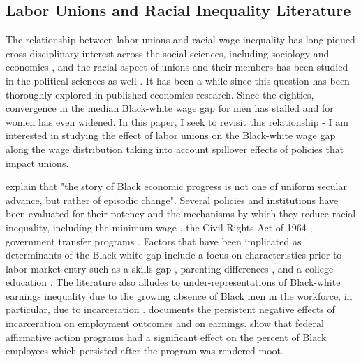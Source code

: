 \documentclass[11pt]{article}
\begin{document}
\subsection{Labor Unions and Racial Inequality Literature}
The relationship between labor unions and racial wage inequality has long piqued cross disciplinary interest across the social sciences, including sociology \citep[see, for example,][]{rosenfeldkleykamp2012, mccall2001} and economics \citep[see, for example,][]{ashenfelter1972, boundfreeman1992}, and the racial aspect of unions and their members has been studied in the political sciences as well \citep[see, for example,][]{frymergrumbach2020}. It has been a while since this question has been thoroughly explored in published economics research. Since the eighties, convergence in the median Black-white wage gap for men has stalled and for women has even widened. In this paper, I seek to revisit this relationship - I am interested in studying the effect of labor unions on the Black-white wage gap along the wage distribution taking into account spillover effects of policies that impact unions.

\citet{donohueheckman1991} explain that "the story of Black economic progress is not one of uniform secular advance, but rather of episodic change". Several policies and institutions have been evaluated for their potency and the mechanisms by which they reduce racial inequality, including the minimum wage \citep[see, for example,][]{derenoncourtmontialoux2020}, the Civil Rights Act of 1964 \citep[see, for example,][]{heckmanpayner1989, fgbh1973}, government transfer programs \citep[see, for example,][]{butlerheckman1977}. Factors that have been implicated as determinants of the Black-white gap include a focus on characteristics prior to labor market entry such as a skills gap \citep[see, for example,][]{nealjohnson1996}, parenting differences \citep[see, for example,][]{abhs2015}, and a college education \citep[see, for example,][]{abh2010}. The literature also alludes to under-representations of Black-white earnings inequality due to the growing absence of Black men in the workforce, in particular, due to incarceration \citep[see, for example][]{bayercharles2018, nealrick2014}. \citet{muellersmith2015} documents the persistent negative effects of incarceration on employment outcomes and on earnings. \citet{miller2017} show that federal affirmative action programs had a significant effect on the percent of Black employees which persisted after the program was rendered moot.
\end{document}
